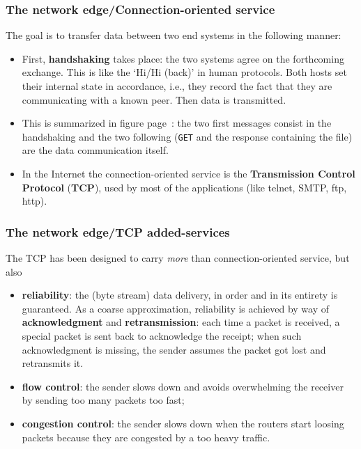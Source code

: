 %
\begin{frame}
\frametitle{The network edge/Connection-oriented service}

The goal is to transfer data between two end systems in the following
manner:

\begin{itemize}
 
  \item First, \textbf{handshaking} takes place: the two systems
  agree on the forthcoming exchange. This is like the `Hi/Hi (back)'
  in human protocols. Both hosts set their internal state in
  accordance, i.e., they record the fact that they are communicating
  with a known peer. Then data is transmitted.

  \item This is summarized in figure page~\pageref{protocols}: the
  two first messages consist in the handshaking and the two following
  (\texttt{GET} and the response containing the file) are the data
  communication itself.

  \item In the Internet the connection-oriented service is the
  \textbf{Transmission Control Protocol} (\textbf{TCP}), used by most
  of the applications (like telnet, SMTP, ftp, http).

\end{itemize}

\end{frame}

%
\begin{frame}
\frametitle{The network edge/TCP added-services}

The TCP has been designed to carry \emph{more} than
connection-oriented service, but also
\begin{itemize}

  \item \textbf{reliability}: the (byte stream) data delivery, in
  order and in its entirety is guaranteed. As a coarse approximation,
  reliability is achieved by way of \textbf{acknowledgment} and
  \textbf{retransmission}: each time a packet is received, a special
  packet is sent back to acknowledge the receipt; when such
  acknowledgment is missing, the sender assumes the packet got lost
  and retransmits it.

  \item \textbf{flow control}: the sender slows down and avoids
  overwhelming the receiver by sending too many packets too fast;


  \item \textbf{congestion control}: the sender slows down when the
  routers start loosing packets because they are congested by a too
  heavy traffic.

\end{itemize}

\end{frame}


